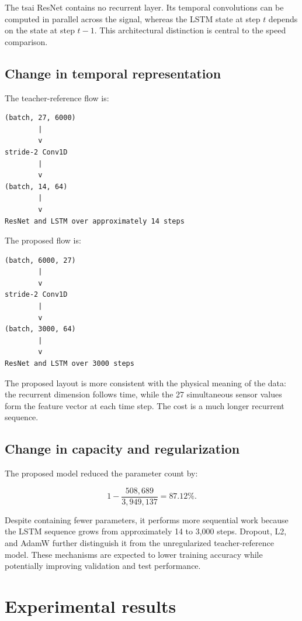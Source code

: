 \documentclass[11pt,a4paper]{article}
\begin{document}
The tsai ResNet contains no recurrent layer. Its temporal convolutions can be
computed in parallel across the signal, whereas the LSTM state at step \(t\)
depends on the state at step \(t-1\). This architectural distinction is central
to the speed comparison.

\subsection{Change in temporal representation}

The teacher-reference flow is:

\begin{lstlisting}
(batch, 27, 6000)
        |
        v
stride-2 Conv1D
        |
        v
(batch, 14, 64)
        |
        v
ResNet and LSTM over approximately 14 steps
\end{lstlisting}

The proposed flow is:

\begin{lstlisting}
(batch, 6000, 27)
        |
        v
stride-2 Conv1D
        |
        v
(batch, 3000, 64)
        |
        v
ResNet and LSTM over 3000 steps
\end{lstlisting}

The proposed layout is more consistent with the physical meaning of the data:
the recurrent dimension follows time, while the 27 simultaneous sensor values
form the feature vector at each time step. The cost is a much longer recurrent
sequence.

\subsection{Change in capacity and regularization}

The proposed model reduced the parameter count by:

\[
1 - \frac{508{,}689}{3{,}949{,}137}
= 87.12\%.
\]

Despite containing fewer parameters, it performs more sequential work because
the LSTM sequence grows from approximately 14 to 3,000 steps. Dropout, L2, and
AdamW further distinguish it from the unregularized teacher-reference model.
These mechanisms are expected to lower training accuracy while potentially
improving validation and test performance.

\section{Experimental results}
\end{document}
